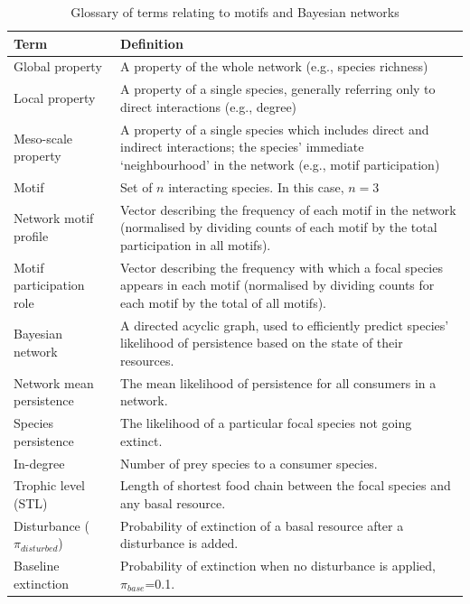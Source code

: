\documentclass[12pt]{article}
\begin{document}
\begin{spacing}{2.0}
 \begin{table}[hb!]
 \label{glossary}
 \caption{Glossary of terms relating to motifs and Bayesian networks}
     \footnotesize{
 \begin{tabular}{l|m{11cm}}
     Term & Definition \\
     \hline
     Global property & A property of the whole network (e.g., species richness) \\
     Local property & A property of a single species, generally referring only to direct interactions (e.g., degree) \\
     Meso-scale property &  A property of a single species which includes direct and indirect interactions; the species' immediate `neighbourhood' in the network (e.g., motif participation) \\
     Motif & Set of $n$ interacting species. In this case, $n=3$ \\
     Network motif profile & Vector describing the frequency of each motif in the network (normalised by dividing counts of each motif by the total participation in  all motifs).\\
     Motif participation role & Vector describing the frequency with which a focal species appears in each motif  (normalised by dividing counts for each motif by the total of all motifs). \\
     Bayesian network & A directed acyclic graph, used to efficiently predict species' likelihood of persistence based on the state of their resources. \\
     Network mean persistence & The mean likelihood of persistence for all consumers in a network.\\
     Species persistence & The likelihood of a particular focal species not going extinct.\\
     In-degree & Number of prey species to a consumer species.\\
     Trophic level (STL) & Length of shortest food chain between the focal species and any basal resource.\\
     Disturbance ($\pi_{disturbed}$) & Probability of extinction of a basal resource after a disturbance is added. \\
     Baseline extinction &  Probability of extinction when no disturbance is applied, $\pi_{base}$=0.1.\\
 \end{tabular}}
 \end{table}
 
\clearpage 

 

\end{spacing}
\end{document}
